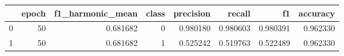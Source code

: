 \begin{tabular}{lrrrrrrr}
\toprule
 & epoch & f1_harmonic_mean & class & precision & recall & f1 & accuracy \\
\midrule
0 & 50 & 0.681682 & 0 & 0.980180 & 0.980603 & 0.980391 & 0.962330 \\
1 & 50 & 0.681682 & 1 & 0.525242 & 0.519763 & 0.522489 & 0.962330 \\
\bottomrule
\end{tabular}
